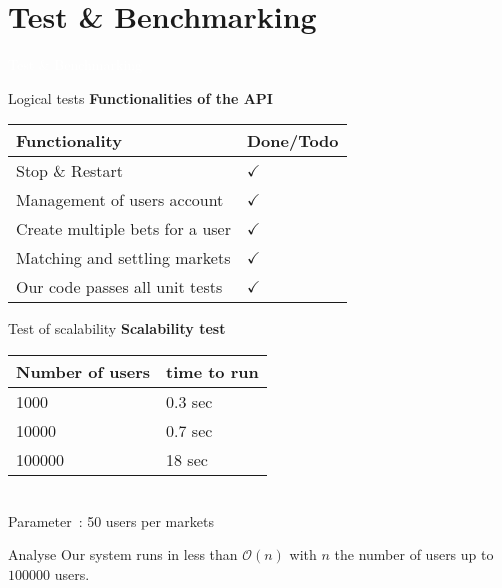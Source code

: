 \documentclass{beamer}
\begin{document}
\section*{Test \& Benchmarking}
\begin{frame}{}
    \centering
    \begin{cadre}
        \textcolor{white}{
            Test \& Benchmarking 
        }
    \end{cadre}
\end{frame}

\begin{frame}{Logical tests}
    \centering
    \textbf{Functionalities of the API}\\
    \begin{tabular}{|l|l|}
        \hline Functionality & Done/Todo \\
        \hline Stop \& Restart & \(\checkmark\) \\
        \hline Management of users account & \(\checkmark\) \\
        \hline Create multiple bets for a user & \(\checkmark\) \\
        \hline Matching and settling markets & \(\checkmark\) \\
        \hline Our code passes all unit tests & \(\checkmark\) \\
        \hline
    \end{tabular}
\end{frame}

\begin{frame}{Test of scalability}
    \centering
    \textbf{Scalability test}\\
    \begin{tabular}{|l|l|}
        \hline Number of users & time to run \\
        \hline 1000            & 0.3 sec\\
        \hline 10000           & 0.7 sec\\
        \hline 100000          & 18  sec\\
        \hline
    \end{tabular}\\
    Parameter~: 50 users per markets
    \begin{alertblock}{Analyse}
        Our system runs in less than \(\mathcal{O}(n)\) with \(n\) the number of users up to \(100000\) users.
    \end{alertblock}
\end{frame}
\end{document}

